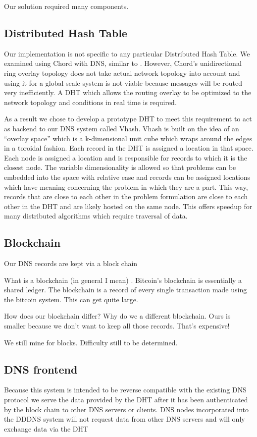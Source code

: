 \documentclass[11pt]{ieeetran} %
\begin{document}
Our solution required many components.

\subsection{Distributed Hash Table}
Our implementation is not specific to any particular Distributed Hash Table.  We examined using Chord \cite{chord} with DNS, similar to  \cite{cox}.  However, Chord’s unidirectional ring overlay topology does not take actual network topology into account and using it for a global scale system is not viable because messages will be routed very inefficiently. A DHT which allows the routing overlay to be optimized to the network topology and conditions in real time is required.

As a result we chose to develop a prototype DHT to meet this requirement to act as backend to our DNS system called Vhash. Vhash is built on the idea of an “overlay space” which is a k-dimensional unit cube which wraps around the edges in a toroidal fashion. Each record in the DHT is assigned a location in that space. Each node is assigned a location and is responsible for records to which it is the closest node. The variable dimensionality is allowed so that problems can be embedded into the space with relative ease and records can be assigned locations which have meaning concerning the problem in which they are a part. This way, records that are close to each other in the problem formulation are close to each other in the DHT and are likely hosted on the same node. This offers speedup for many distributed algorithms which require traversal of data.

\subsection{Blockchain}
Our DNS records are kept via a block chain

What is a blockchain (in general I mean) \cite{bitcoin} \cite{namecoin}.
Bitcoin's blockchain is essentially a shared ledger.  The blockchain is a record of every single transaction made using the bitcoin system.  This can get quite large.

How does our blockchain differ?  Why do we a different blockchain.  Ours is smaller because we don't want to keep all those records. That's expensive! 

We still mine for blocks.  Difficulty still to be determined.


\subsection{DNS frontend}
Because this system is intended to be reverse compatible with the existing DNS protocol we serve the data provided by the DHT after it has been authenticated by the block chain to other DNS servers or clients. DNS nodes incorporated into the DDDNS system will not request data from other DNS servers and will only exchange data via the DHT 
\end{document}
